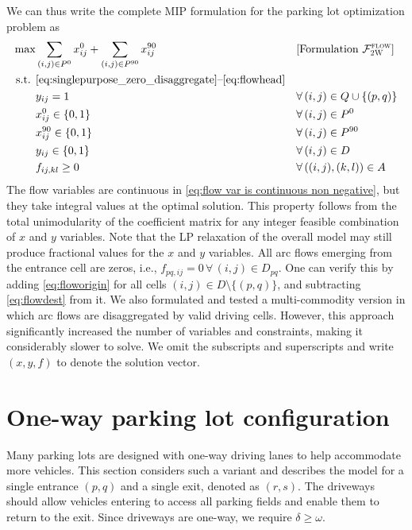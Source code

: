 \documentclass[10pt]{article}
\newcommand{\zeroparkvar}[2]{x^{0}_{#1#2}}
\newcommand{\ninetyparkvar}[2]{x^{90}_{#1#2}}
\newcommand{\drivevar}[2]{y_{#1#2}}
\newcommand{\flowvar}[4]{f_{#1#2,#3#4}}
\newcommand{\validzeroparkset}{P^{0}}
\newcommand{\validninetyparkset}{P^{90}}
\newcommand{\validdriveset}{D}
\newcommand{\existingdriveset}{Q}
\newcommand{\gridadjset}[2]{D_{#1#2}}
\newcommand{\gridarcset}{A}
\newcommand{\parkwidth}{\omega}
\newcommand{\drivewidth}{\delta}
\newcommand{\entranceset}{\{(\entrancex, \entrancey)\}}
\newcommand{\entrancex}{p}
\newcommand{\entrancey}{q}
\newcommand{\exitx}{r}
\newcommand{\exity}{s}
\theoremstyle{definition}
\begin{document}
We can thus write the complete MIP formulation for the parking lot optimization problem as
\begin{align}
   \max & \sum_{(i,j) \in \validzeroparkset} \zeroparkvar{i}{j} + \sum_{(i,j) \in \validninetyparkset} \ninetyparkvar{i}{j}  && [\text{Formulation } \mathcal{F}^{\textsc{flow}}_{\textsc{2W}}] \\
     \text{s.t. } & \eqref{eq:singlepurpose_zero_disaggregate} \text{--}\eqref{eq:flowhead}&& \notag \\
     &  \drivevar{i}{j} = 1 \qquad && \forall \, (i,j) \in   \existingdriveset \cup \entranceset \label{eq:existing drive vars} \\
    & \zeroparkvar{i}{j} \in \{0,1\} \qquad && \forall \, (i,j) \in \validzeroparkset \label{eq: x_zero is binary}\\
    & \ninetyparkvar{i}{j} \in \{0,1\} \qquad && \forall \, (i,j) \in \validninetyparkset \label{eq: x_ninety is binary}\\
    & \drivevar{i}{j} \in \{0,1\} \qquad && \forall \, (i,j) \in \validdriveset \label{eq: y var is binary}\\   
    & \flowvar{i}{j}{k}{l} \geq 0 \qquad && \forall \, ((i,j), (k,l)) \label{eq:flow var is continuous non negative}\in \gridarcset
\end{align}
The flow variables are continuous in \eqref{eq:flow var is continuous non negative}, but they take integral values at the optimal solution. This property follows from the total unimodularity of the coefficient matrix for any integer feasible combination of $x$ and $y$ variables. Note that the LP relaxation of the overall model may still produce fractional values for the $x$ and $y$ variables. All arc flows emerging from the entrance cell are zeros, i.e., $\flowvar{\entrancex}{\entrancey}{i}{j} = 0 \, \forall \, (i,j) \in \gridadjset{\entrancex}{\entrancey} \label{eq:outflow from entry cell is zero}$. One can verify this by adding \eqref{eq:floworigin} for all cells $(i,j) \in \validdriveset \setminus \{(\entrancex, \entrancey)\}$, and subtracting \eqref{eq:flowdest} from it. We also formulated and tested a multi-commodity version in which arc flows are disaggregated by valid driving cells. However, this approach significantly increased the number of variables and constraints, making it considerably slower to solve. We omit the subscripts and superscripts and write $(x, y, f)$ to denote the solution vector.



\section{One-way parking lot configuration}
\label{sec:one_way}
Many parking lots are designed with one-way driving lanes to help accommodate more vehicles. This section considers such a variant and describes the model for a single entrance $(\entrancex,\entrancey)$ and a single exit, denoted as $(\exitx,\exity)$. The driveways should allow vehicles entering to access all parking fields and enable them to return to the exit. Since driveways are one-way, we require $\drivewidth \geq \parkwidth$. 
\end{document}
